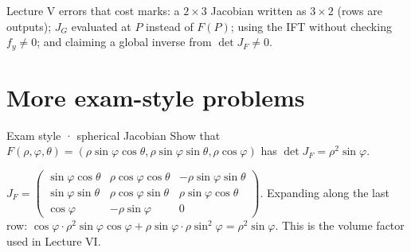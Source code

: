 \begin{trap}
Lecture V errors that cost marks: a $2\times3$ Jacobian written as $3\times2$ (rows are
outputs); $J_G$ evaluated at $P$ instead of $F(P)$; using the IFT without checking $f_y\ne0$;
and claiming a global inverse from $\det J_F\ne0$.
\end{trap}

\section{More exam-style problems}

\begin{problem}{Exam style · spherical Jacobian}
Show that $F(\rho,\varphi,\theta)=(\rho\sin\varphi\cos\theta,\rho\sin\varphi\sin\theta,\rho\cos\varphi)$ has
$\det J_F=\rho^2\sin\varphi$.
\end{problem}
\begin{solution}
$J_F=\begin{pmatrix}\sin\varphi\cos\theta&\rho\cos\varphi\cos\theta&-\rho\sin\varphi\sin\theta\\
\sin\varphi\sin\theta&\rho\cos\varphi\sin\theta&\rho\sin\varphi\cos\theta\\ \cos\varphi&-\rho\sin\varphi&0\end{pmatrix}$.
Expanding along the last row:
$\cos\varphi\cdot\rho^2\sin\varphi\cos\varphi+\rho\sin\varphi\cdot\rho\sin^2\varphi=\rho^2\sin\varphi$. This is the
volume factor used in Lecture VI.
\end{solution}

